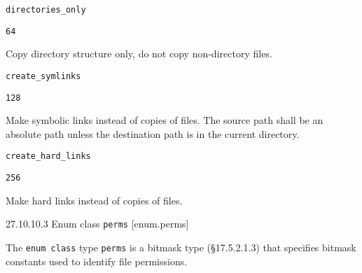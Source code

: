 \texttt{directories\_only}

\texttt{64}

Copy directory structure only, do not copy non-directory files.

\texttt{create\_symlinks}

\texttt{128}

Make symbolic links instead of copies of files. The source path shall be
an absolute path unless the destination path is in the current
directory.

\texttt{create\_hard\_links}

\texttt{256}

Make hard links instead of copies of files.

27.10.10.3 Enum class \texttt{perms} {[}enum.perms{]}

The \texttt{enum\ class} type \texttt{perms} is a bitmask type
(§17.5.2.1.3) that specifies bitmask constants used to identify file
permissions.

